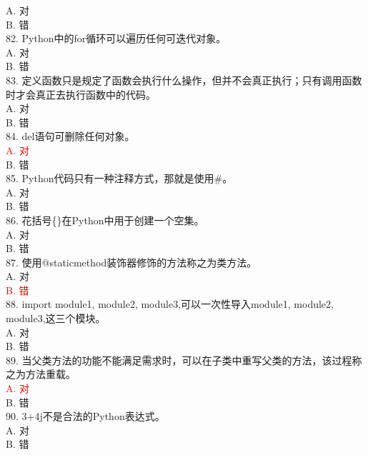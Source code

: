 \documentclass[6pt]{article}
\begin{document}
A. 对\\
B. 错\\

82. Python中的for循环可以遍历任何可迭代对象。\\

A. 对\\
B. 错\\

83. 定义函数只是规定了函数会执行什么操作，但并不会真正执行；只有调用函数时才会真正去执行函数中的代码。\\

A. 对\\
B. 错\\

84. del语句可删除任何对象。\\

\textcolor{red}{A. 对}\\
B. 错\\

85. Python代码只有一种注释方式，那就是使用\#。\\

A. 对\\
B. 错\\

86. 花括号\{\}在Python中用于创建一个空集。\\

A. 对\\
B. 错\\

87. 使用@staticmethod装饰器修饰的方法称之为类方法。\\

A. 对\\
\textcolor{red}{B. 错}\\

88. import module1, module2, module3,可以一次性导入module1, module2, module3,这三个模块。\\

A. 对\\
B. 错\\

89. 当父类方法的功能不能满足需求时，可以在子类中重写父类的方法，该过程称之为方法重载。\\

\textcolor{red}{A. 对}\\
B. 错\\

90. 3+4j不是合法的Python表达式。\\

A. 对\\
B. 错\\
\end{document}
